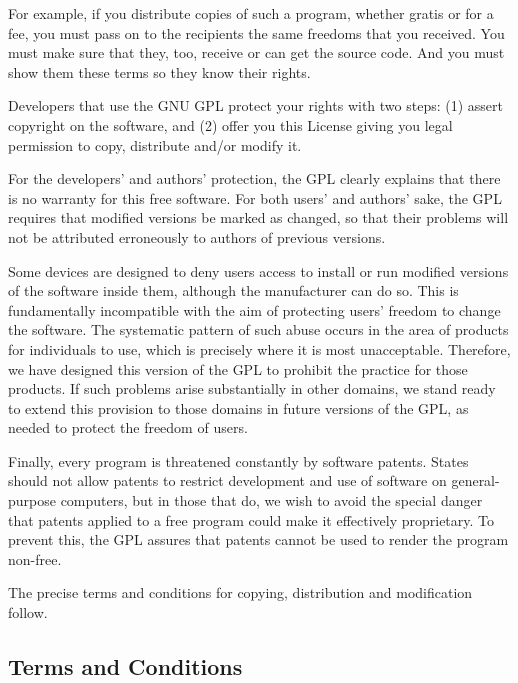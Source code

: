 \documentclass{article}
\begin{document}
For example, if you distribute copies of such a program, whether gratis or for a fee, you must pass on to the recipients the same freedoms that you received.  You must make sure that they, too, receive or can get the source code.  And you must show them these terms so they know their rights.

Developers that use the GNU GPL protect your rights with two steps: (1) assert copyright on the software, and (2) offer you this License giving you legal permission to copy, distribute and/or modify it.

For the developers' and authors' protection, the GPL clearly explains that there is no warranty for this free software.  For both users' and authors' sake, the GPL requires that modified versions be marked as changed, so that their problems will not be attributed erroneously to authors of previous versions.

Some devices are designed to deny users access to install or run modified versions of the software inside them, although the manufacturer can do so.  This is fundamentally incompatible with the aim of protecting users' freedom to change the software.  The systematic pattern of such abuse occurs in the area of products for individuals to use, which is precisely where it is most unacceptable.  Therefore, we have designed this version of the GPL to prohibit the practice for those products.  If such problems arise substantially in other domains, we stand ready to extend this provision to those domains in future versions of the GPL, as needed to protect the freedom of users.

Finally, every program is threatened constantly by software patents. States should not allow patents to restrict development and use of software on general-purpose computers, but in those that do, we wish to avoid the special danger that patents applied to a free program could make it effectively proprietary.  To prevent this, the GPL assures that patents cannot be used to render the program non-free.

The precise terms and conditions for copying, distribution and modification follow.

\subsection{Terms and Conditions}
\end{document}
